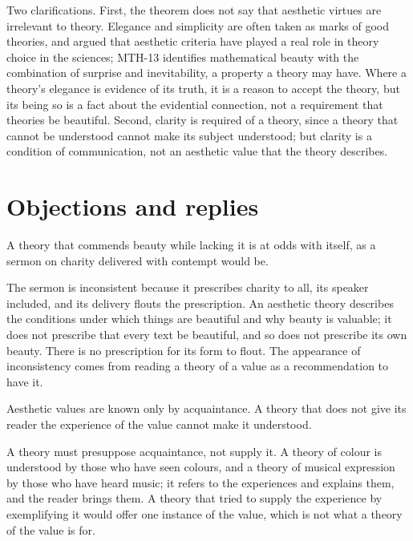 \documentclass{situationist-preprint}
\begin{document}
Two clarifications. First, the theorem does not say that aesthetic virtues are irrelevant to theory. Elegance and simplicity are often taken as marks of good theories, and \citet{McAllister1996} argued that aesthetic criteria have played a real role in theory choice in the sciences; MTH-13 identifies mathematical beauty with the combination of surprise and inevitability, a property a theory may have. Where a theory's elegance is evidence of its truth, it is a reason to accept the theory, but its being so is a fact about the evidential connection, not a requirement that theories be beautiful. Second, clarity is required of a theory, since a theory that cannot be understood cannot make its subject understood; but clarity is a condition of communication, not an aesthetic value that the theory describes.

\section{Objections and replies}

\begin{objection}\label{o:incons}
A theory that commends beauty while lacking it is at odds with itself, as a sermon on charity delivered with contempt would be.
\end{objection}

\begin{reply}
The sermon is inconsistent because it prescribes charity to all, its speaker included, and its delivery flouts the prescription. An aesthetic theory describes the conditions under which things are beautiful and why beauty is valuable; it does not prescribe that every text be beautiful, and so does not prescribe its own beauty. There is no prescription for its form to flout. The appearance of inconsistency comes from reading a theory of a value as a recommendation to have it.
\end{reply}

\begin{objection}[Acquaintance]\label{o:acq}
Aesthetic values are known only by acquaintance. A theory that does not give its reader the experience of the value cannot make it understood.
\end{objection}

\begin{reply}
A theory must presuppose acquaintance, not supply it. A theory of colour is understood by those who have seen colours, and a theory of musical expression by those who have heard music; it refers to the experiences and explains them, and the reader brings them. A theory that tried to supply the experience by exemplifying it would offer one instance of the value, which is not what a theory of the value is for.
\end{reply}
\end{document}
